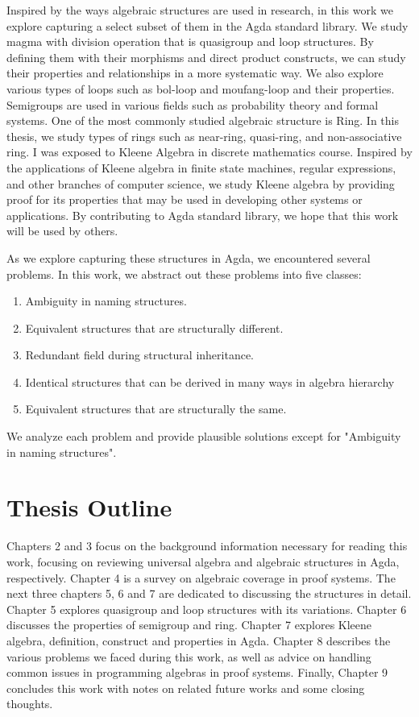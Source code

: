 Inspired by the ways algebraic structures are used in research, in this work we
explore capturing a select subset of them in the Agda standard library. We study
magma with division operation that is quasigroup and loop structures. By
defining them with their morphisms and direct product constructs, we can study
their properties and relationships in a more systematic way. We also explore
various types of loops such as bol-loop and moufang-loop and their properties.
Semigroups are used in various fields such as probability theory and formal
systems. One of the most commonly studied algebraic structure is Ring. In this
thesis, we study types of rings such as near-ring, quasi-ring, and
non-associative ring. I was exposed to Kleene Algebra in discrete mathematics
course. Inspired by the applications of Kleene algebra in finite state machines,
regular expressions, and other branches of computer science, we study Kleene
algebra by providing proof for its properties that may be used in developing
other systems or applications. By contributing to Agda standard library, we hope
that this work will be used by others. 

As we explore capturing these structures in Agda, we encountered several
problems. In this work, we abstract out these problems into five classes:
\begin{enumerate}
\item Ambiguity in naming structures.
\item Equivalent structures that are structurally different.
\item Redundant field during structural inheritance.
\item Identical structures that can be derived in many ways in algebra hierarchy
\item Equivalent structures that are structurally the same.
\end{enumerate}
We analyze each problem and provide plausible solutions except for "Ambiguity in naming structures".

\section{Thesis Outline}
Chapters 2 and 3 focus on the background information necessary for reading this
work, focusing on reviewing universal algebra and algebraic structures in Agda,
respectively. Chapter 4 is a survey on algebraic coverage in proof systems. The
next three chapters 5, 6 and 7 are dedicated to discussing the structures in
detail. Chapter 5 explores quasigroup and loop structures with its variations.
Chapter 6 discusses the properties of semigroup and ring. Chapter 7 explores
Kleene algebra, definition, construct and properties in Agda. Chapter 8
describes the various problems we faced during this work, as well as advice on
handling common issues in programming algebras in proof systems. Finally,
Chapter 9 concludes this work with notes on related future works and some
closing thoughts.
